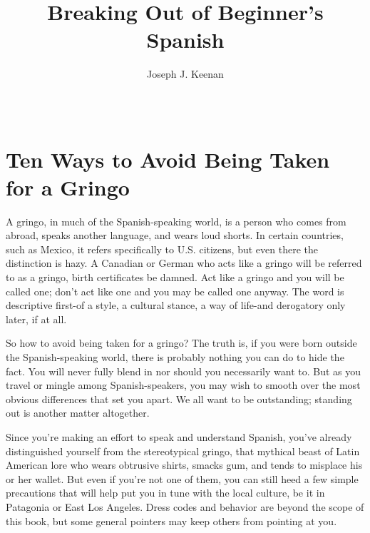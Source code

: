 \documentclass[14pt,a4paper,oneside]{memoir}
\begin{document}
\frontmatter

\begin{titlingpage}
\title{Breaking Out of Beginner's Spanish}
\posttitle{\par\vskip1em{\normalfont\normalsize\maltese\par}\end{center}}
\author{Joseph J. Keenan}
\date{~}

\maketitle
\end{titlingpage}

\tableofcontents*

\mainmatter

\chapter{Ten Ways to Avoid Being Taken for a Gringo}

A gringo, in much of the Spanish-speaking world, is a person
who comes from abroad, speaks another language, and wears loud
shorts. In certain countries, such as Mexico, it refers specifically to
U.S. citizens, but even there the distinction is hazy. A Canadian or
German who acts like a gringo will be referred to as a gringo, birth certificates be damned. Act like a gringo and you will be called one; don't
act like one and you may be called one anyway. The word is descriptive
first-of a style, a cultural stance, a way of life-and derogatory only
later, if at all.

So how to avoid being taken for a gringo? The truth is, if you
were born outside the Spanish-speaking world, there is probably nothing you can do to hide the fact. You will never fully blend in nor
should you necessarily want to. But as you travel or mingle among
Spanish-speakers, you may wish to smooth over the most obvious differences that set you apart. We all want to be outstanding; standing out
is another matter altogether.

Since you're making an effort to speak and understand Spanish, you've already distinguished yourself from the stereotypical
gringo, that mythical beast of Latin American lore who wears obtrusive shirts, smacks gum, and tends to misplace his or her wallet. But
even if you're not one of them, you can still heed a few simple precautions that will help put you in tune with the local culture, be it in Patagonia or East Los Angeles. Dress codes and behavior are beyond the
scope of this book, but some general pointers may keep others from
pointing at you.
\end{document}
